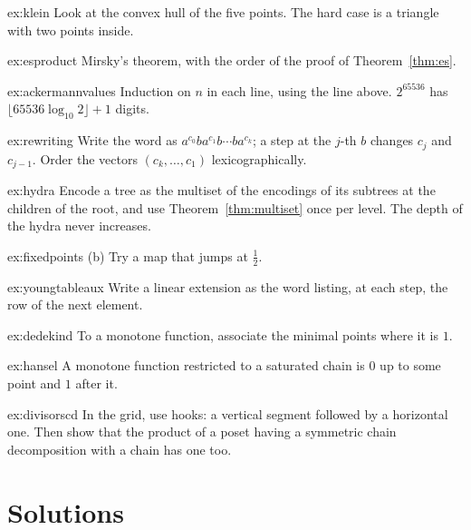 \begin{hint}{ex:klein}
Look at the convex hull of the five points. The hard case is a triangle with two points inside.
\end{hint}
\begin{hint}{ex:esproduct}
Mirsky's theorem, with the order of the proof of Theorem~\ref{thm:es}.
\end{hint}
\begin{hint}{ex:ackermannvalues}
Induction on $n$ in each line, using the line above. $2^{65536}$ has $\lfloor65536\log_{10}2\rfloor+1$ digits.
\end{hint}
\begin{hint}{ex:rewriting}
Write the word as $a^{c_0}ba^{c_1}b\cdots ba^{c_k}$; a step at the $j$-th $b$ changes $c_j$ and $c_{j-1}$. Order the vectors $(c_k,\dots,c_1)$
lexicographically.
\end{hint}
\begin{hint}{ex:hydra}
Encode a tree as the multiset of the encodings of its subtrees at the children of the root, and use
Theorem~\ref{thm:multiset} once per level. The depth of the hydra never increases.
\end{hint}
\begin{hint}{ex:fixedpoints}
(b) Try a map that jumps at $\frac12$.
\end{hint}
\begin{hint}{ex:youngtableaux}
Write a linear extension as the word listing, at each step, the row of the next element.
\end{hint}
\begin{hint}{ex:dedekind}
To a monotone function, associate the minimal points where it is $1$.
\end{hint}
\begin{hint}{ex:hansel}
A monotone function restricted to a saturated chain is $0$ up to some point and $1$ after it.
\end{hint}
\begin{hint}{ex:divisorscd}
In the grid, use hooks: a vertical segment followed by a horizontal one. Then show that the product of a poset having a
symmetric chain decomposition with a chain has one too.
\end{hint}

\section{Solutions}

